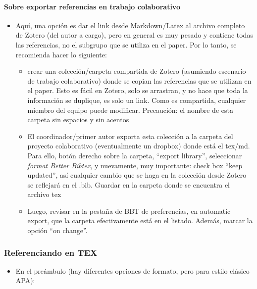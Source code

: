\documentclass[11pt,]{book}
\providecommand{\tightlist}{%
  \setlength{\itemsep}{0pt}\setlength{\parskip}{0pt}}
\let\oldparagraph\paragraph
\renewcommand{\paragraph}[1]{\oldparagraph{#1}\mbox{}}
\begin{document}
\hypertarget{sobre-exportar-referencias-en-trabajo-colaborativo}{%
\paragraph{Sobre exportar referencias en trabajo colaborativo}\label{sobre-exportar-referencias-en-trabajo-colaborativo}}

\begin{itemize}
\tightlist
\item
  Aquí, una opción es dar el link desde Markdown/Latex al archivo completo de Zotero (del autor a cargo), pero en general es muy pesado y contiene todas las referencias, no el subgrupo que se utiliza en el paper. Por lo tanto, se recomienda hacer lo siguiente:

  \begin{itemize}
  \tightlist
  \item
    crear una colección/carpeta compartida de Zotero (asumiendo escenario de trabajo colaborativo) donde se copian las referencias que se utilizan en el paper. Esto es fácil en Zotero, solo se arrastran, y no hace que toda la información se duplique, es solo un link. Como es compartida, cualquier miembro del equipo puede modificar. Precaución: el nombre de esta carpeta sin espacios y sin acentos
  \item
    El coordinador/primer autor exporta esta colección a la carpeta del proyecto colaborativo (eventualmente un dropbox) donde está el tex/md. Para ello, botón derecho sobre la carpeta, ``export library'', seleccionar \emph{format Better Bibtex}, y nuevamente, muy importante: check box ``keep updated'', así cualquier cambio que se haga en la colección desde Zotero se reflejará en el .bib. Guardar en la carpeta donde se encuentra el archivo tex
  \item
    Luego, revisar en la pestaña de BBT de preferencias, en automatic export, que la carpeta efectivamente está en el listado. Además, marcar la opción ``on change''.
  \end{itemize}
\end{itemize}

\hypertarget{referenciando-en-tex}{%
\subsubsection{Referenciando en TEX}\label{referenciando-en-tex}}

\begin{itemize}
\tightlist
\item
  En el preámbulo (hay diferentes opciones de formato, pero para estilo clásico APA):
\end{itemize}
\end{document}
